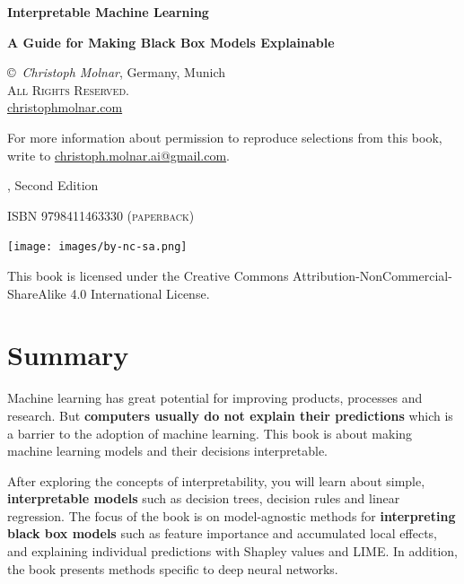 \documentclass[
  11pt,
]{scrbook}
\begin{document}
\thispagestyle{empty}
\begin{center}
  {
  \bfseries \sffamily \LARGE Interpretable Machine Learning\par
  \bfseries \small A Guide for Making Black Box Models Explainable\par
}

\copyright~\the\year \textit{Christoph Molnar}, Germany, Munich\\
\textsc{All Rights Reserved.}\\
\url{christophmolnar.com}

For more information about permission to reproduce selections from this book, write to \url{christoph.molnar.ai@gmail.com}.

	\the\year, Second Edition

\ifxetex
	\textsc{ISBN 9798411463330 (paperback)} 
\fi

\texttt{[image: images/by-nc-sa.png]}

This book is licensed under the Creative Commons Attribution-NonCommercial-ShareAlike 4.0 International License.

\end{center}

\newpage
\thispagestyle{empty}
\mbox{}
\newpage

{
\hypersetup{linkcolor=}
\setcounter{tocdepth}{1}
\tableofcontents
}
\hypertarget{summary}{%
\chapter*{Summary}\label{summary}}


Machine learning has great potential for improving products, processes and research.
But \textbf{computers usually do not explain their predictions} which is a barrier to the adoption of machine learning.
This book is about making machine learning models and their decisions interpretable.

After exploring the concepts of interpretability, you will learn about simple, \textbf{interpretable models} such as decision trees, decision rules and linear regression.
The focus of the book is on model-agnostic methods for \textbf{interpreting black box models} such as feature importance and accumulated local effects, and explaining individual predictions with Shapley values and LIME.
In addition, the book presents methods specific to deep neural networks.
\end{document}

